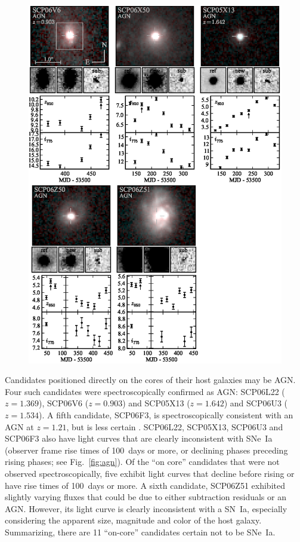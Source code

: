 \begin{figure}[p]
\includegraphics[width=\textwidth]{figures/cands/agn3.eps}
\end{figure}

Candidates positioned directly on the cores of their host galaxies may
be AGN. Four such candidates were spectroscopically confirmed as AGN:
SCP06L22 ($z=1.369$), SCP06V6 ($z=0.903$) and SCP05X13 ($z=1.642$) and
SCP06U3 ($z=1.534$). A fifth candidate, SCP06F3, is spectroscopically
consistent with an AGN at $z=1.21$, but is less certain \citep[see
  spectroscopy reported in][]{morokuma10a}. SCP06L22, SCP05X13,
SCP06U3 and SCP06F3 also have light curves that are clearly
inconsistent with SNe~Ia (observer frame rise times of 100~days or
more, or declining phases preceding rising phases; see
Fig.~\ref{fig:agn}). Of the ``on core'' candidates that were not
observed spectroscopically, five exhibit light curves that decline
before rising or have rise times of 100~days or more. A sixth
candidate, SCP06Z51 exhibited slightly varying fluxes that could be
due to either subtraction residuals or an AGN.  However, its light
curve is clearly inconsistent with a SN~Ia, especially considering the
apparent size, magnitude and color of the host galaxy. Summarizing,
there are 11 ``on-core'' candidates certain not to be SNe~Ia.

